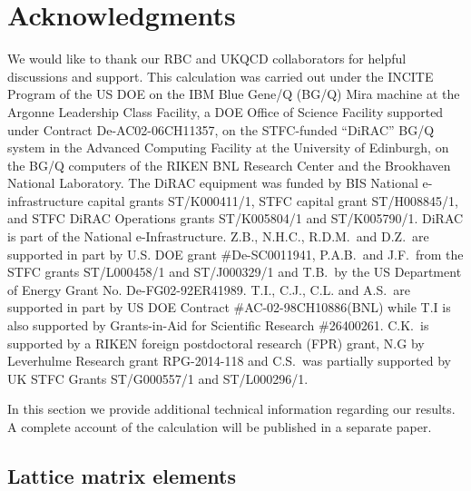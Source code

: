 \documentclass[aps,prl,
superscriptaddress,
showpacs,
preprintnumbers,
bibnotes,
amsmath,
amssymb,
twocolumn,
floatfix,
]{revtex4-1}
\begin{document}
\section{Acknowledgments}

We would like to thank our RBC and UKQCD collaborators for helpful discussions and support.  This calculation was carried out under the INCITE Program of the US DOE on the IBM Blue Gene/Q (BG/Q) Mira machine at the Argonne Leadership Class Facility, a DOE Office of Science Facility supported under Contract De-AC02-06CH11357, on the STFC-funded ``DiRAC'' BG/Q system in the Advanced Computing Facility at the University of Edinburgh, on the BG/Q computers of the RIKEN BNL Research Center and the Brookhaven National Laboratory.  The DiRAC equipment was funded by BIS National e-infrastructure capital grants ST/K000411/1, STFC capital grant ST/H008845/1, and STFC DiRAC Operations grants ST/K005804/1 and ST/K005790/1.  DiRAC is part of the National e-Infrastructure.  Z.B., N.H.C., R.D.M.~and D.Z.~are supported in part by U.S. DOE grant \#De-SC0011941,  P.A.B.~and J.F.~from the STFC grants ST/L000458/1 and ST/J000329/1 and T.B.~by the US Department of Energy Grant No. De-FG02-92ER41989.   T.I., C.J., C.L. and A.S.~are supported in part by US DOE Contract \#AC-02-98CH10886(BNL) while T.I is also supported by Grants-in-Aid for Scientific Research \#26400261.  C.K.~is supported by a RIKEN foreign postdoctoral research (FPR) grant, N.G by Leverhulme Research grant RPG-2014-118 and C.S.~was partially supported by UK STFC Grants ST/G000557/1 and  ST/L000296/1.



\clearpage
\newpage

\setcounter{page}{1}
\renewcommand{\thepage}{Supplementary Information -- S\arabic{page}}
\setcounter{table}{0}
\renewcommand{\thetable}{S\,\Roman{table}}
\setcounter{equation}{0}
\renewcommand{\theequation}{S\,\arabic{equation}}

In this section we provide additional technical information regarding our results.  A complete account of the calculation will be published in a separate paper.

\subsection{Lattice matrix elements}
\end{document}
